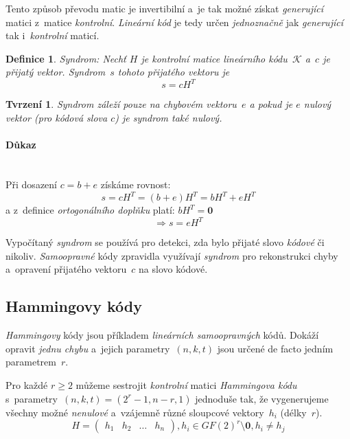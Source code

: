 \documentclass[thesis=M,czech,hidelinks]{FITthesis}[2012/06/26]
\newcommand{\0}{{\textcolor[gray]{0.75}{0}}}
\newtheorem{tvrzeni}{Tvrzení}
\newtheorem{definice}{Definice}
\begin{document}
Tento způsob převodu matic je invertibilní a~je tak možné získat
\emph{generující} matici z~matice \emph{kontrolní}. \emph{Lineární kód} je tedy
určen \emph{jednoznačně} jak \emph{generující} tak i~\emph{kontrolní} maticí.

\begin{definice}{Syndrom:}
    Nechť $H$ je \emph{kontrolní} matice \emph{lineárního} kódu~$\mathcal{K}$
    a~$c$ je přijatý vektor. \emph{Syndrom}~$s$ tohoto přijatého vektoru je
    $$ s = c H^T $$
\end{definice}

\begin{tvrzeni}
    \emph{Syndrom} záleží pouze na chybovém vektoru~$e$ a pokud je $e$ nulový
    vektor (pro kódová slova $c$) je syndrom také \emph{nulový}.
\end{tvrzeni}

\paragraph{Důkaz} \hfil \\
Při dosazení $c=b+e$ získáme rovnost:
$$ s = c H^T = (b+e)H^T = b H^T + e H^T $$
a z~definice \emph{ortogonálního doplňku} platí: $ b H^T = \textbf{0} $
$$ \Rightarrow s = e H^T $$

Vypočítaný \emph{syndrom} se používá pro detekci, zda bylo přijaté slovo
\emph{kódové} či nikoliv. \emph{Samoopravné} kódy zpravidla využívají
\emph{syndrom} pro rekonstrukci chyby a~opravení přijatého vektoru~$c$ na slovo
kódové.

\subsection{Hammingovy kódy}\label{kap_hammingovy_kody}

\emph{Hammingovy} kódy jsou příkladem \emph{lineárních samoopravných} kódů.
Dokáží opravit \emph{jednu chybu} a~jejich parametry~$(n,k,t)$ jsou určené de
facto jedním parametrem~$r$.

Pro každé $r \geq 2$ můžeme sestrojit \emph{kontrolní} matici \emph{Hammingova
kódu} s~parametry~$(n,k,t) = (2^r-1,n-r,1)$ jednoduše tak, že vygenerujeme
všechny možné \emph{nenulové} a~vzájemně různé sloupcové vektory~$h_i$
(délky~$r$).
$$
    H = \left(
    \begin{array}{*{4}{c}}
        h_1 & h_2 & \ldots & h_n
    \end{array}
    \right), h_i \in GF(2)^r \setminus \textbf{0}, h_i \neq h_j
$$
\end{document}
